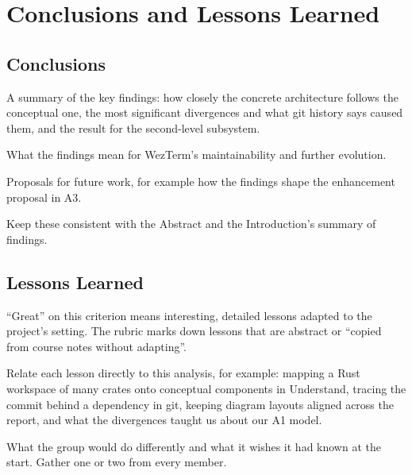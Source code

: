 \section{Conclusions and Lessons Learned}
\label{sec:conclusions}


\subsection{Conclusions}
\label{sec:conclusions-findings}

\begin{requirements}
  \item A summary of the key findings: how closely the concrete architecture follows the conceptual one, the most significant divergences and what git history says caused them, and the result for the second-level subsystem.
  \item What the findings mean for WezTerm's maintainability and further evolution.
  \item Proposals for future work, for example how the findings shape the enhancement proposal in A3.
  \item Keep these consistent with the Abstract and the Introduction's summary of findings.
\end{requirements}

\subsection{Lessons Learned}
\label{sec:lessons-learned}

\begin{requirements}
  \item ``Great'' on this criterion means interesting, detailed lessons adapted to the project's setting. The rubric marks down lessons that are abstract or ``copied from course notes without adapting''.
  \item Relate each lesson directly to this analysis, for example: mapping a Rust workspace of many crates onto conceptual components in Understand, tracing the commit behind a dependency in git, keeping diagram layouts aligned across the report, and what the divergences taught us about our A1 model.
  \item What the group would do differently and what it wishes it had known at the start. Gather one or two from every member.
\end{requirements}
